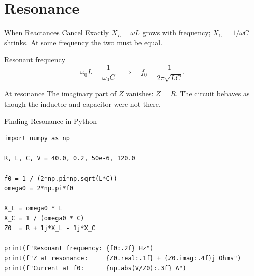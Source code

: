 \documentclass[9pt,aspectratio=169,xcolor=table]{beamer}
\begin{document}
\section{Resonance}

\begin{frame}{When Reactances Cancel Exactly}
    \leavevmode
    $X_L = \omega L$ grows with frequency; $X_C = 1/\omega C$ shrinks.
    At some frequency the two must be equal.

    \vspace{3mm}
    \begin{block}{Resonant frequency}
        \[
        \omega_0 L = \frac{1}{\omega_0 C} \quad\Longrightarrow\quad
        f_0 = \frac{1}{2\pi\sqrt{LC}}.
        \]
    \end{block}

    \vspace{2mm}
    \begin{alertblock}{At resonance}
        The imaginary part of $Z$ vanishes: $Z = R$. The circuit
        behaves as though the inductor and capacitor were not there.
    \end{alertblock}
\end{frame}

\begin{frame}[fragile]{Finding Resonance in Python}
    \leavevmode
\begin{lstlisting}
import numpy as np

R, L, C, V = 40.0, 0.2, 50e-6, 120.0

f0 = 1 / (2*np.pi*np.sqrt(L*C))
omega0 = 2*np.pi*f0

X_L = omega0 * L
X_C = 1 / (omega0 * C)
Z0  = R + 1j*X_L - 1j*X_C

print(f"Resonant frequency: {f0:.2f} Hz")
print(f"Z at resonance:     {Z0.real:.1f} + {Z0.imag:.4f}j Ohms")
print(f"Current at f0:      {np.abs(V/Z0):.3f} A")
\end{lstlisting}
\end{frame}
\end{document}

